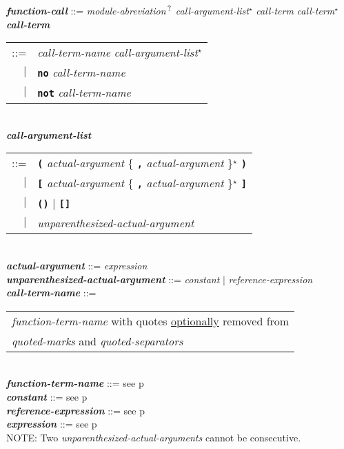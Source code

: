 \documentclass[12pt]{article}
\newcommand{\TT}[1]{{\tt \bfseries #1}}
\newcommand{\STAR}{{\Large $^\star$}}
\newcommand{\QMARK}{{$^{\,\mbox{\footnotesize ?}}$}}
\newcommand{\ttkey}[1]{{\tt \bfseries #1}}
\newcommand{\emkey}[1]{{\em \bfseries #1}}
\newcommand{\pagref}[1]{p\pageref{#1}}
\newenvironment{indpar}[1][0.3in]%
	{\begin{list}{}%
		     {\setlength{\itemsep}{0in}%
		      \setlength{\topsep}{0in}%
		      \setlength{\parsep}{1ex}%
		      \setlength{\labelwidth}{#1}%
		      \setlength{\leftmargin}{#1}%
		      \addtolength{\leftmargin}{\labelsep}}%
	 \item}%
	{\end{list}}
\begin{document}
\begin{indpar}
\emkey{function-call} ::= {\em module-abreviation}\QMARK{}
    	                  {\em call-argument-list}\STAR{}
                          {\em call-term} {\em call-term}\STAR{}
\\[0.5ex]
\emkey{call-term}
    \begin{tabular}[t]{rl}
    ::= & {\em call-term-name} {\em call-argument-list}\STAR{} \\
    $|$ & \ttkey{no} {\em call-term-name} \\
    $|$ & \ttkey{not} {\em call-term-name} \\
    \end{tabular}
\\[0.5ex]
\emkey{call-argument-list}
    \begin{tabular}[t]{rl}
    ::= & \TT{(} {\em actual-argument}
          \{ \TT{,} {\em actual-argument} \}\STAR{} \TT{)} \\
    $|$ & \TT{[} {\em actual-argument}
          \{ \TT{,} {\em actual-argument} \}\STAR{} \TT{]} \\
    $|$ & \TT{()} $|$ \TT{[]} \\
    $|$ & {\em unparenthesized-actual-argument} \\
    \end{tabular}
\\[0.5ex]
\emkey{actual-argument} ::= {\em expression}
\\[0.5ex]
\emkey{unparenthesized-actual-argument} ::=
    {\em constant} $|$ {\em reference-expression}
\\[0.5ex]
\emkey{call-term-name}\label{CALL-TERM-NAME} ::=
    \begin{tabular}[t]{@{}l}
    {\em function-term-name} with quotes \underline{optionally} removed from \\
    {\em quoted-marks} and {\em quoted-separators}
    \end{tabular}
\\[0.5ex]
\emkey{function-term-name} ::= see \pagref{FUNCTION-TERM-NAME}
\\[0.5ex]
\emkey{constant} ::= see \pagref{CONSTANTS}
\\[0.5ex]
\emkey{reference-expression} ::= see \pagref{REFERENCE-EXPRESSIONS}
\\[0.5ex]
\emkey{expression} ::= see \pagref{EXPRESSION}
\\[2.0ex]
NOTE: Two {\em unparenthesized-actual-arguments} cannot be consecutive.
\end{indpar}
\end{document}
